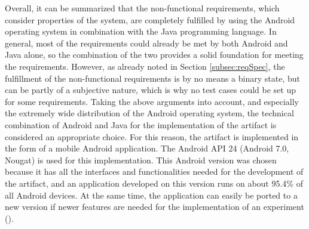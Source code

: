 Overall, it can be summarized that the non-functional requirements, which consider properties of the system, are completely fulfilled by using the Android operating system in combination with the Java programming language. In general, most of the requirements could already be met by both Android and Java alone, so the combination of the two provides a solid foundation for meeting the requirements. However, as already noted in Section \ref{subsec:reqSpec}, the fulfillment of the non-functional requirements is by no means a binary state, but can be partly of a subjective nature, which is why no test cases could be set up for some requirements. Taking the above arguments into account, and especially the extremely wide distribution of the Android operating system, the technical combination of Android and Java for the implementation of the artifact is considered an appropriate choice. For this reason, the artifact is implemented in the form of a mobile Android application. The Android API 24 (Android 7.0, Nougat) is used for this implementation. This Android version was chosen because it has all the interfaces and functionalities needed for the development of the artifact, and an application developed on this version runs on about 95.4\% of all Android devices. At the same time, the application can easily be ported to a new version if newer features are needed for the implementation of an experiment (\cite{Google.2023}). 

